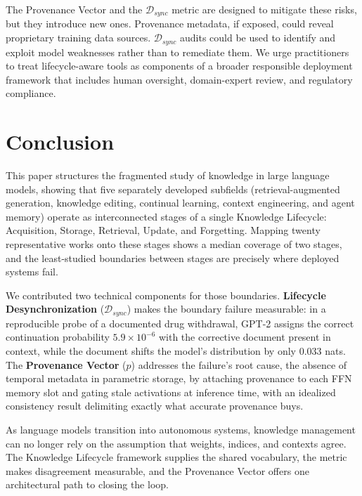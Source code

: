 \documentclass[manuscript, screen, review]{jair}
\begin{document}
The Provenance Vector and the $\mathcal{D}_{sync}$ metric are designed to mitigate these risks, but they introduce new ones. Provenance metadata, if exposed, could reveal proprietary training data sources. $\mathcal{D}_{sync}$ audits could be used to identify and exploit model weaknesses rather than to remediate them. We urge practitioners to treat lifecycle-aware tools as components of a broader responsible deployment framework that includes human oversight, domain-expert review, and regulatory compliance.

\section{Conclusion}
\label{sec:conclusion}

This paper structures the fragmented study of knowledge in large language models, showing that five separately developed subfields (retrieval-augmented generation, knowledge editing, continual learning, context engineering, and agent memory) operate as interconnected stages of a single Knowledge Lifecycle: Acquisition, Storage, Retrieval, Update, and Forgetting. Mapping twenty representative works onto these stages shows a median coverage of two stages, and the least-studied boundaries between stages are precisely where deployed systems fail.

We contributed two technical components for those boundaries. \textbf{Lifecycle Desynchronization} ($\mathcal{D}_{sync}$) makes the boundary failure measurable: in a reproducible probe of a documented drug withdrawal, GPT-2 assigns the correct continuation probability $5.9 \times 10^{-6}$ with the corrective document present in context, while the document shifts the model's distribution by only $0.033$ nats. The \textbf{Provenance Vector} ($p$) addresses the failure's root cause, the absence of temporal metadata in parametric storage, by attaching provenance to each FFN memory slot and gating stale activations at inference time, with an idealized consistency result delimiting exactly what accurate provenance buys.

As language models transition into autonomous systems, knowledge management can no longer rely on the assumption that weights, indices, and contexts agree. The Knowledge Lifecycle framework supplies the shared vocabulary, the metric makes disagreement measurable, and the Provenance Vector offers one architectural path to closing the loop.
\end{document}
